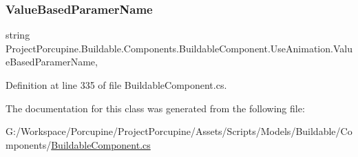 \subsubsection{\texorpdfstring{Value\+Based\+Paramer\+Name}{ValueBasedParamerName}}
{\footnotesize\ttfamily string Project\+Porcupine.\+Buildable.\+Components.\+Buildable\+Component.\+Use\+Animation.\+Value\+Based\+Paramer\+Name\hspace{0.3cm}{\ttfamily [get]}, {\ttfamily [set]}}



Definition at line 335 of file Buildable\+Component.\+cs.



The documentation for this class was generated from the following file\+:\begin{DoxyCompactItemize}
\item 
G\+:/\+Workspace/\+Porcupine/\+Project\+Porcupine/\+Assets/\+Scripts/\+Models/\+Buildable/\+Components/\hyperlink{_buildable_component_8cs}{Buildable\+Component.\+cs}\end{DoxyCompactItemize}
